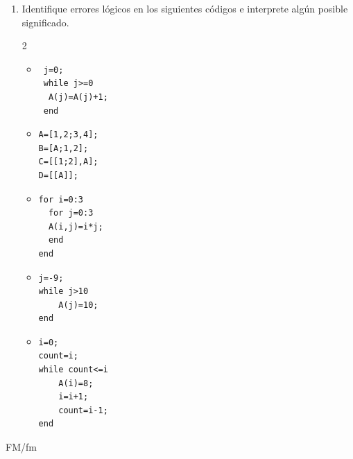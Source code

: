 \documentclass[11pt]{article}
\begin{document}
\begin{enumerate}
\begin{multicols}{2}
\begin{itemize}
\begin{verbatim}
A(1:10,1)=3;
for i=1:10
  j=1;
  while j<2
      if(i>1&&i<3)
      A(i,j)=A(i,j)+1;
      else
      A(i,j)=0;
      end
      j=j+1;
  end
end
\end{verbatim}

   \item[d)] 
\begin{verbatim}
A=1;
for i=1:10
  A(:,end+2)=1
  A(end+1,:)=0;
end
\end{verbatim}
    \end{itemize}
	\end{multicols}
    
    \item Identifique errores l\'ogicos en los siguientes c\'odigos e interprete alg\'un posible significado.
    
    \begin{multicols}{2} 
      \begin{itemize}
       \item[a)]
\begin{verbatim}
 j=0;
 while j>=0
  A(j)=A(j)+1;
 end
\end{verbatim}

       \item[b)]
\begin{verbatim}
A=[1,2;3,4];
B=[A;1,2];
C=[[1;2],A];
D=[[A]];
\end{verbatim}

       \item[c)]
\begin{verbatim}
for i=0:3
  for j=0:3
  A(i,j)=i*j;
  end
end
\end{verbatim}

       \item[d)]
\begin{verbatim}
j=-9;
while j>10
    A(j)=10;
end
\end{verbatim}

       \item[e)]
\begin{verbatim}
i=0;
count=i;
while count<=i
    A(i)=8;
    i=i+1;
    count=i-1;
end
\end{verbatim}
\end{itemize}
    \end{multicols}

      
  \end{enumerate}
  
  \vfill FM/fm
\end{document}
